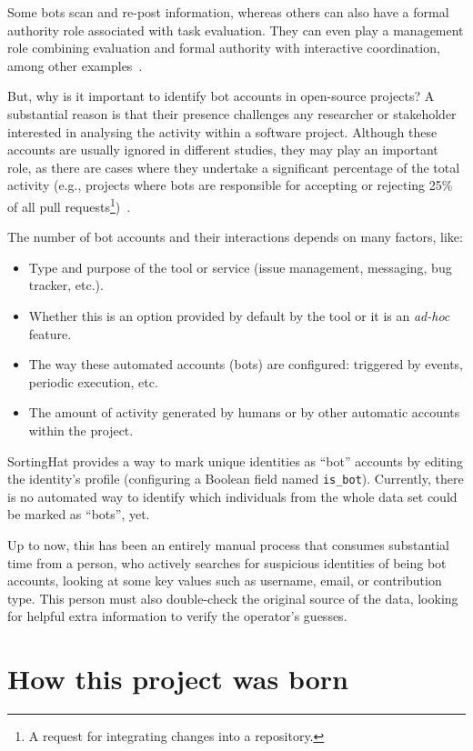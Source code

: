 \documentclass[a4paper, 12pt]{book}
\begin{document}
Some bots scan and re-post information, whereas others can also have a formal authority role associated with task evaluation. They can even play a management role combining evaluation and formal authority with interactive coordination, among other examples~\cite{hukal-et-al-bots-coordinating-oss}.

But, why is it important to identify bot accounts in open-source projects? A substantial reason is that their presence challenges any researcher or stakeholder interested in analysing the activity within a software project. Although these accounts are usually ignored in different studies, they may play an important role, as there are cases where they undertake a significant percentage of the total activity (e.g., projects where bots are responsible for accepting or rejecting 25\% of all pull requests\footnote{A request for integrating changes into a repository.})~\cite{golzadeh-mens-ground-truth-github2021}.

The number of bot accounts and their interactions depends on many factors, like:
\begin{itemize}
    \item Type and purpose of the tool or service (issue management, messaging, bug tracker, etc.).
    \item Whether this is an option provided by default by the tool or it is an \textit{ad-hoc} feature.
    \item The way these automated accounts (bots) are configured: triggered by events, periodic execution, etc.
    \item The amount of activity generated by humans or by other automatic accounts within the project.
\end{itemize}

SortingHat provides a way to mark unique identities as ``bot'' accounts by editing the identity’s profile (configuring a Boolean field named \texttt{is\_bot}). Currently, there is no automated way to identify which individuals from the whole data set could be marked as ``bots'', yet.

Up to now, this has been an entirely manual process that consumes substantial time from a person, who actively searches for suspicious identities of being bot accounts, looking at some key values such as username, email, or contribution type. This person must also double-check the original source of the data, looking for helpful extra information to verify the operator’s guesses.

\section{How this project was born}
\label{sec:intro-project-origin}
\end{document}
